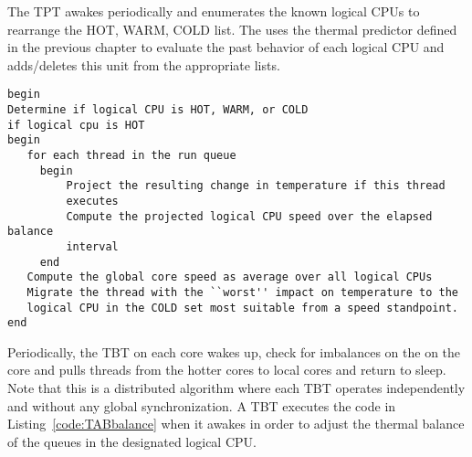 The TPT awakes periodically and enumerates the known logical CPUs to
rearrange the HOT, WARM, COLD list.   The uses the thermal predictor
defined in the previous chapter to evaluate the past behavior of each
logical CPU and adds/deletes this unit from the appropriate
lists. 

\begin{lstlisting}[float,label=code:TABbalance,caption=TAB Balancing Algorithm]
begin
Determine if logical CPU is HOT, WARM, or COLD
if logical cpu is HOT
begin
   for each thread in the run queue
     begin
         Project the resulting change in temperature if this thread
         executes
         Compute the projected logical CPU speed over the elapsed balance
         interval
     end
   Compute the global core speed as average over all logical CPUs
   Migrate the thread with the ``worst'' impact on temperature to the
   logical CPU in the COLD set most suitable from a speed standpoint.
end
\end{lstlisting}
Periodically, the TBT on each core wakes up, check for imbalances
on the on the core and pulls threads from the hotter cores to local
cores and return to sleep.    Note that this is a distributed algorithm
where each TBT operates independently and without any global
synchronization.   A TBT executes the code in
Listing~\ref{code:TABbalance} when it awakes in order to adjust the
thermal balance of the queues in the designated logical CPU.


